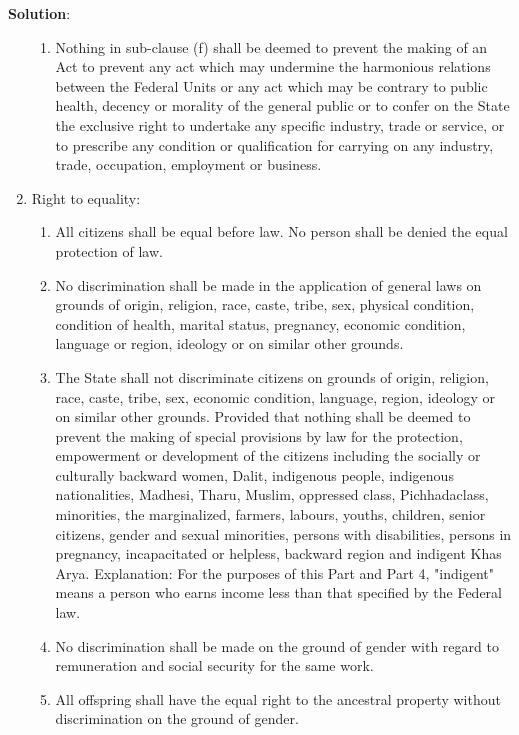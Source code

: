 \documentclass[
  openany]{book}
\newenvironment{solution}{ {\bfseries Solution}:}{}
\begin{document}
\begin{questions}
\begin{solution}
\begin{enumerate}
\begin{enumerate}
\item Nothing in sub-clause (f) shall be deemed to prevent the making of an Act to prevent any act which may undermine the harmonious relations between the Federal Units or any act which may be contrary to public health, decency or morality of the general public or to confer on the State the exclusive right to undertake any specific industry, trade or service, or to prescribe any condition or qualification for carrying on any industry, trade, occupation, employment or business.
\end{enumerate}

\item Right to equality:
\begin{enumerate}
\item All citizens shall be equal before law. No person shall be denied the equal protection of law.
\item No discrimination shall be made in the application of general laws on grounds of origin, religion, race, caste, tribe, sex, physical condition, condition of health, marital status, pregnancy, economic condition, language or region, ideology or on similar other grounds.
\item The State shall not discriminate citizens on grounds of origin, religion, race, caste, tribe, sex, economic condition, language, region, ideology or on similar other grounds. Provided that nothing shall be deemed to prevent the making of special provisions by law for the protection, empowerment or development of the citizens including the socially or culturally backward women, Dalit, indigenous people, indigenous nationalities, Madhesi, Tharu, Muslim, oppressed class, Pichhadaclass, minorities, the marginalized, farmers, labours, youths, children, senior citizens, gender and sexual minorities, persons with disabilities, persons in pregnancy, incapacitated or helpless, backward region and indigent Khas Arya.
Explanation: For the purposes of this Part and Part 4, "indigent" means a person who earns income less than that specified by the Federal law.
\item No discrimination shall be made on the ground of gender with regard to remuneration and social security for the same work.
\item All offspring shall have the equal right to the ancestral property without discrimination on the ground of gender.
\end{enumerate}


\end{enumerate}
\end{solution}
\end{questions}
\end{document}
